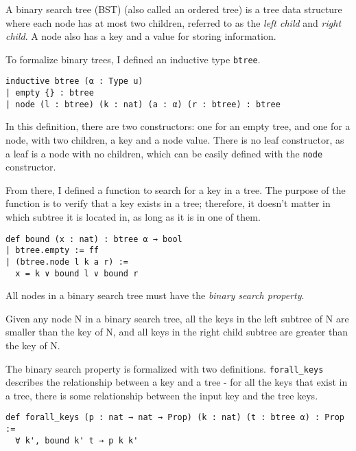 A binary search tree (BST) (also called an ordered tree) is a tree data structure where each node has at most two children, referred to as the \textit{left child} and \textit{right child}. A node also has a key and a value for storing information.

To formalize binary trees, I defined an inductive type \lstinline{btree}.

\begin{lstlisting}[caption=\empty]
inductive btree (α : Type u)
| empty {} : btree
| node (l : btree) (k : nat) (a : α) (r : btree) : btree
\end{lstlisting}

In this definition, there are two constructors: one for an empty tree, and one for a node, with two children, a key and a node value. There is no leaf constructor, as a leaf is a node with no children, which can be easily defined with the \lstinline{node} constructor.

From there, I defined a function to search for a key in a tree. The purpose of the function is to verify that a key exists in a tree; therefore, it doesn't matter in which subtree it is located in, as long as it is in one of them.

\begin{lstlisting}[caption=\empty]
def bound (x : nat) : btree α → bool
| btree.empty := ff
| (btree.node l k a r) :=
  x = k ∨ bound l ∨ bound r
\end{lstlisting}

All nodes in a binary search tree must have the \textit{binary search property}.

\begin{definition}
  \label{def:bst_property}
  Given any node N in a binary search tree, all the keys in the left subtree of N are smaller than the key of N, and all keys in the right child subtree are greater than the 
  key of N.
\end{definition}

The binary search property is formalized with two definitions. \lstinline{forall_keys} describes the relationship between a key and a tree - for all the keys that exist in a tree, there is some relationship between the input key and the tree keys. 

\begin{lstlisting}[caption=\empty]
def forall_keys (p : nat → nat → Prop) (k : nat) (t : btree α) : Prop :=
  ∀ k', bound k' t → p k k'
\end{lstlisting}

